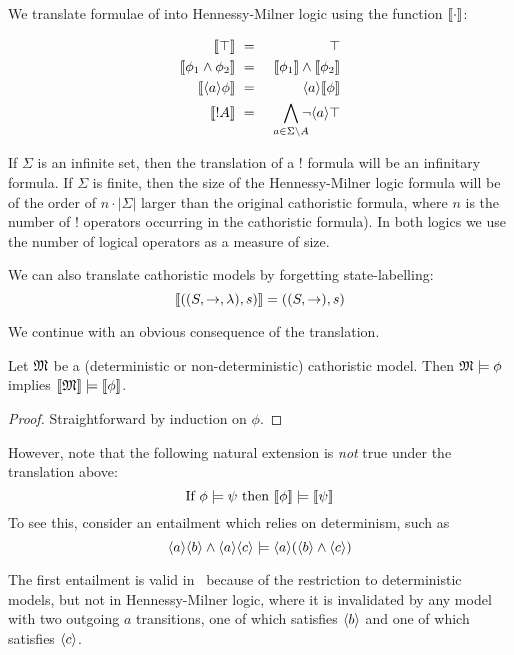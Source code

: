 \begin{definition}
 We translate formulae of \cathoristic{} into Hennessy-Milner logic
 using the function $\lbrack\!\lbrack \cdot \rbrack\!\rbrack$:

\begin{eqnarray*}
  \SEMB{\top} & \ = \ & \top  \\
  \SEMB{\phi_1 \AND \phi_2} & \ = \ & \SEMB{\phi_1} \AND \SEMB{\phi_2}  \\
  \SEMB{\langle a \rangle \phi} & \ = \ & \langle a \rangle \SEMB{\phi}  \\
  \SEMB{! A} & \ = \ & \bigwedge_{a \in \Sigma \setminus A}\!\!\!\! \neg \langle a \rangle \top 
\end{eqnarray*}

\end{definition}

\NI If $\Sigma$ is an infinite set, then the translation of a $!$
formula will be an infinitary formula.  If $\Sigma$ is finite, then
the size of the Hennessy-Milner logic formula will be of the order of $n \cdot | \Sigma |$
larger than the original cathoristic formula, where $n$ is the number of
$!$ operators occurring in the cathoristic formula). In both logics we
use the number of logical operators as a measure of size.

We can also translate cathoristic models by forgetting state-labelling:
\[
   \lbrack\!\lbrack ((S, \rightarrow, \lambda), s) \rbrack\!\rbrack 
      =
   ((S, \rightarrow), s)
\]

\NI We continue with an obvious consequence of the translation.

\begin{theorem}
Let $\frak{M}$ be a (deterministic or non-deterministic) cathoristic
  model. Then $\frak{M} \models \phi$ implies $\lbrack\!\lbrack \frak{M} \rbrack\!\rbrack \models
  \lbrack\!\lbrack \phi \rbrack\!\rbrack$.
\end{theorem}
\begin{proof}
Straightforward by induction on $\phi$.
\end{proof}

\NI However, note that the following natural extension is \emph{not} true
under the translation above:
\[
  \text{If } \phi \models \psi \text{ then } \lbrack\!\lbrack \phi \rbrack\!\rbrack \models \lbrack\!\lbrack \psi \rbrack\!\rbrack
\]
To see this, consider an entailment which relies on determinism, such as
\[
\langle a \rangle \langle b \rangle \land \langle a \rangle \langle c \rangle \models \langle a \rangle (\langle b \rangle \land \langle c \rangle )
\]

\NI The first entailment is valid in \cathoristic\ because of the
restriction to deterministic models, but not in Hennessy-Milner
logic, where it is invalidated by any model with two outgoing $a$
transitions, one of which satisfies $\MAY{b}$ and one of which
satisfies $\MAY{c}$.

